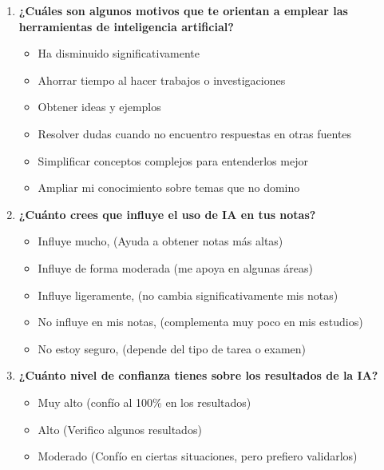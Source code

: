 \begin{multicols}{2}
\begin{enumerate}
      \begin{itemize}
        \item Ciclos 1-2
        \item Ciclos 3-4
        \item Ciclos 5-6
        \item Ciclos 7-8
        \item Ciclos 9-10
      \end{itemize}
      \item \textbf{¿Cuáles son algunos motivos que te orientan a emplear las herramientas de inteligencia artificial?}
      \begin{itemize}
          \item Ha disminuido significativamente
          \item Ahorrar tiempo al hacer trabajos o investigaciones
          \item Obtener ideas y ejemplos
          \item Resolver dudas cuando no encuentro respuestas en otras fuentes
          \item Simplificar conceptos complejos para entenderlos mejor
          \item Ampliar mi conocimiento sobre temas que no domino
      \end{itemize}
      \columnbreak
      \item \textbf{¿Cuánto crees que influye el uso de IA en tus notas?}
      \begin{itemize}
          \item Influye mucho, (Ayuda a obtener notas más altas)
          \item Influye de forma moderada (me apoya en algunas áreas)
          \item Influye ligeramente, (no cambia significativamente mis notas)
          \item No influye en mis notas, (complementa muy poco en mis estudios)
          \item No estoy seguro, (depende del tipo de tarea o examen)
      \end{itemize}
      \item \textbf{¿Cuánto nivel de confianza tienes sobre los resultados de la IA?}
      \begin{itemize}
        \item Muy alto (confío al 100\% en los resultados)
        \item Alto (Verifico algunos resultados)
        \item Moderado (Confío en ciertas situaciones, pero prefiero validarlos)

\end{itemize}
\end{enumerate}
\end{multicols}
